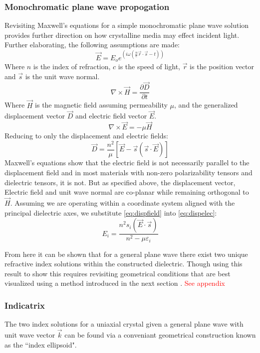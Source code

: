 \subsubsection{Monochromatic plane wave propogation}
Revisiting Maxwell's equations for a simple monochromatic plane wave solution provides further direction on how crystalline media may effect incident light. Further elaborating, the following assumptions are made:
\begin{equation}
\vec{E} = E_o e^{(i \omega (\frac{n}{c} \vec{r}\cdot \vec{s}-t))}
\end{equation}
Where $n$ is the index of refraction, $c$ is the speed of light, $\vec{r}$ is the position vector and $\vec{s}$ is the unit wave normal.
\begin{equation}
\nabla \times \vec{H}= \frac{\partial \vec{D}}{\partial t}
\end{equation}
Where $\vec{H}$ is the magnetic field assuming permeability $\mu$, and the generalized displacement vector $\vec{D}$ and electric field vector $\vec{E}$.
\begin{equation}
\nabla \times \vec{E} = -\mu \vec{H}
\end{equation}
Reducing to only the displacement and electric fields:
\begin{equation}\label{eq:dispelec}
\vec{D} = \frac{n^2}{\mu}[\vec{E}-\vec{s}(\vec{s}\cdot \vec{E})]
\end{equation}
Maxwell's equations show that the electric field is not necessarily parallel to the displacement field and in most materials with non-zero polarizability tensors and dielectric tensors, it is not. But as specified above, the displacement vector, Electric field and unit wave normal are co-planar while remaining orthogonal to $\vec{H}$. Assuming we are operating within a coordinate system aligned with the principal dielectric axes, we substitute \autoref{eq:dispfield} into \autoref{eq:dispelec}:
\begin{equation}\label{eq:modelec}
E_i = \frac{n^2 s_i (\vec{E}\cdot\vec{s})}{n^2 - \mu \varepsilon_i}
\end{equation}

From here it can be shown that for a general plane wave there exist two unique refractive index solutions within the constructed dielectric. Though using this result to show this requires revisiting geometrical conditions that are best visualized using a method introduced in the next section \cite{nye}. \textcolor{red}{See appendix}

\subsubsection{Indicatrix}\label{sec:indicatrix}
The two index solutions for a uniaxial crystal given a general plane wave with unit wave vector $\vec{k}$ can be found via a conveniant geometrical construction known as the ``index ellipsoid". 

